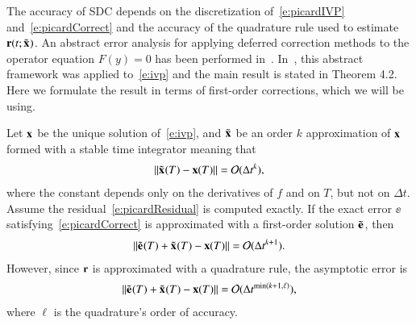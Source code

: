 The accuracy of SDC depends on the discretization
of~\eqref{e:picardIVP} and~\eqref{e:picardCorrect} and the accuracy of
the quadrature rule used to estimate ${\mathbf{r}}(t;{\tilde{{\mathbf{x}}}_{}})$.  An abstract
error analysis for applying deferred correction methods to the operator
equation $F(y)=0$ has been performed
in~\cite{boh:ste1984,lin1980,ske1982,ste1973}.  In~\cite{han:str2011},
this abstract framework was applied to~\eqref{e:ivp} and the main
result is stated in Theorem 4.2.  Here we formulate the result in terms
of first-order corrections, which we will be using.
\begin{proposition}
\label{pro:convergence}
Let ${\mathbf{x}}$ be the unique solution of~\eqref{e:ivp}, and ${\tilde{{\mathbf{x}}}_{}}$ be an
order $k$ approximation of ${\mathbf{x}}$ formed with a stable time integrator
meaning that
\begin{align*}
  \|{\tilde{{\mathbf{x}}}_{}}(T) - {\mathbf{x}}(T)\| = \mathcal{O}(\Delta t^{k}),
\end{align*}
where the constant depends only on the derivatives of $f$ and on $T$,
but not on $\Delta t$.  Assume the residual~\eqref{e:picardResidual} is
computed exactly.  If the exact error $\ee$
satisfying~\eqref{e:picardCorrect} is approximated with a first-order
solution ${\tilde{{\mathbf{e}}}_{}}$, then
\begin{align*}
  \|{\tilde{{\mathbf{e}}}_{}}(T) + {\tilde{{\mathbf{x}}}_{}}(T) - {\mathbf{x}}(T)\| = \mathcal{O}(\Delta t^{k+1}).
\end{align*}
However, since ${\mathbf{r}}$ is approximated with a quadrature rule,
the asymptotic error is
\begin{align*}
  \|{\tilde{{\mathbf{e}}}_{}}(T) + {\tilde{{\mathbf{x}}}_{}}(T) - {\mathbf{x}}(T)\| = \mathcal{O}(\Delta t^{\min(k+1,\ell)}),
\end{align*}
where $\ell$ is the quadrature's order of accuracy.
\end{proposition}
